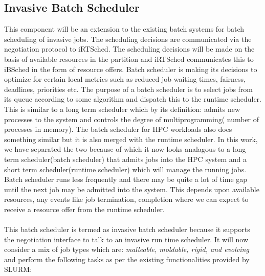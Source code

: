 \subsection{Invasive Batch Scheduler}
This component will be an extension to the existing batch systems for batch scheduling of invasive jobs. The scheduling decisions are communicated via the negotiation protocol to iRTSched. The scheduling decisions will be made on the basis of available resources in the partition and iRTSched communicates this to iBSched in the form of resource offers. Batch scheduler is making its decisions to optimize for certain local metrics such as reduced job waiting times, fairness, deadlines, priorities etc. The purpose of a batch scheduler is to select jobs from its queue according to some algorithm and dispatch this to the runtime scheduler. This is similar to a long term scheduler which by its definition: admits new processes to the system and controls the degree of multiprogramming( number of processes in memory). The batch scheduler for HPC workloads also does something similar but it is also merged with the runtime scheduler. In this work, we have separated the two because of which it now looks analagous to a long term scheduler(batch scheduler) that admits jobs into the HPC system and a short term scheduler(runtime scheduler) which will manage the running jobs. Batch scheduler runs less frequently and there may be quite a lot of time gap until the next job may be admitted into the system. This depends upon available resources, any events like job termination, completion where we can expect to receive a resource offer from the runtime scheduler.\\ \\
This batch scheduler is termed as invasive batch scheduler because it supports the negotiation interface to talk to an invasive run time scheduler. It will now consider a mix of job types which are: \textit{malleable, moldable, rigid, and evolving} and perform the following tasks as per the existing functionalities provided by SLURM:
